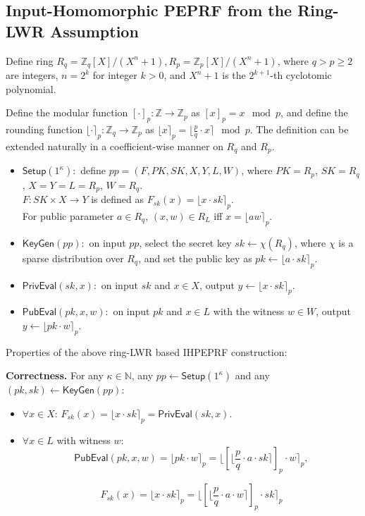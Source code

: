 \documentclass[a4paper,10pt]{article}
\begin{document}
\subsection{Input-Homomorphic PEPRF from the Ring-LWR Assumption}
Define ring $R_q=\mathbb{Z}_q[X]/(X^n+1), R_p=\mathbb{Z}_p[X]/(X^n+1)$, where $q>p\geq 2$ are integers, $n=2^k$ for integer $k>0$, and $X^n+1$ is the $2^{k+1}$-th cyclotomic polynomial.

Define the modular function $[\cdot]_p: \mathbb{Z}\rightarrow\mathbb{Z}_p$ as $[x]_p= x \mod p$, and
define the rounding function $\lfloor\cdot\rceil_p: \mathbb{Z}_q\rightarrow\mathbb{Z}_p$ as $\lfloor x\rceil_p=\lfloor\frac{p}{q}\cdot x\rceil \mod p$. The definition can be extended naturally in a coefficient-wise manner on $R_q$ and $R_p$.

\begin{itemize}
\item $\mathsf{Setup}(1^\kappa):$ define $pp=(F, PK, SK, X, Y, L, W)$, where $PK=R_p$, $SK=R_q$, $X=Y=L=R_p$, $W=R_q$. \\
    $F:SK\times X\rightarrow Y$ is defined as $F_{sk}(x)=\lfloor x\cdot sk\rceil_p$. \\
    For public parameter $a\in R_q$, $(x,w)\in R_L$ iff $x=\lfloor aw\rceil_p$.

\item $\mathsf{KeyGen}(pp):$ on input $pp$, select the secret key $sk\leftarrow \chi(R_q)$, where $\chi$ is a sparse distribution over $R_q$, and set the public key as $pk\leftarrow \lfloor a\cdot sk\rceil_p$.

\item $\mathsf{PrivEval}(sk,x):$ on input $sk$ and $x\in X$, output $y\leftarrow \lfloor x\cdot sk\rceil_p$.

\item $\mathsf{PubEval}(pk,x,w):$ on input $pk$ and $x\in L$ with the witness $w\in W$, output $y\leftarrow \lfloor pk\cdot w\rceil_p$.

\end{itemize}

Properties of the above ring-LWR based IHPEPRF construction:
\begin{trivlist}
\item \textbf{Correctness.} For any $\kappa \in \mathbb{N}$, any $pp\leftarrow\mathsf{Setup}(1^\kappa)$ 
    and any $(pk, sk)\leftarrow\mathsf{KeyGen}(pp)$:
\begin{itemize}
    \item $\forall x\in X$: $F_{sk}(x) = \lfloor x\cdot sk\rceil_p = \mathsf{PrivEval}(sk,x)$.
    \item $\forall x\in L$ with witness $w$:
    \[
    \mathsf{PubEval}(pk,x,w)= \lfloor pk\cdot w\rceil_p = \lfloor[\lfloor\frac{p}{q}\cdot a\cdot sk\rceil]_p\cdot w\rceil_p,
    \]
    
    \[
    F_{sk}(x)=\lfloor x\cdot sk \rceil_p =\lfloor[\lfloor\frac{p}{q}\cdot a\cdot w\rceil]_p\cdot sk\rceil_p
    \]
\end{itemize}
\end{trivlist}
\end{document}
